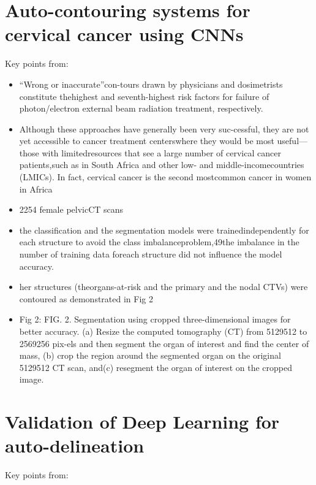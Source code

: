 \documentclass[11pt]{article}
\begin{document}
\section{Auto-contouring systems for cervical cancer using CNNs}

Key points from: \cite{Rhee2020-ms}

\begin{itemize}
    \item “Wrong or inaccurate”con-tours drawn by physicians and dosimetrists constitute thehighest and seventh-highest risk factors for failure of photon/electron external beam radiation treatment, respectively.
    \item Although these approaches have generally been very suc-cessful, they are not yet accessible to cancer treatment centerswhere they would be most useful—those with limitedresources that see a large number of cervical cancer patients,such as in South Africa and other low- and middle-incomecountries (LMICs). In fact, cervical cancer is the second mostcommon cancer in women in Africa
    \item 2254 female pelvicCT scans
    \item the classification and the segmentation models were trainedindependently for each structure to avoid the class imbalanceproblem,49the imbalance in the number of training data foreach structure did not influence the model accuracy.
    \item her structures (theorgans-at-risk and the primary and the nodal CTVs) were contoured as demonstrated in Fig 2
    \item Fig 2: FIG. 2. Segmentation using cropped three-dimensional images for better accuracy. (a) Resize the computed tomography (CT) from 5129512 to 2569256 pix-els and then segment the organ of interest and find the center of mass, (b) crop the region around the segmented organ on the original 5129512 CT scan, and(c) resegment the organ of interest on the cropped image.
\end{itemize}

\section{Validation of Deep Learning for auto-delineation}

Key points from: \cite{LIU2020172}
\end{document}
